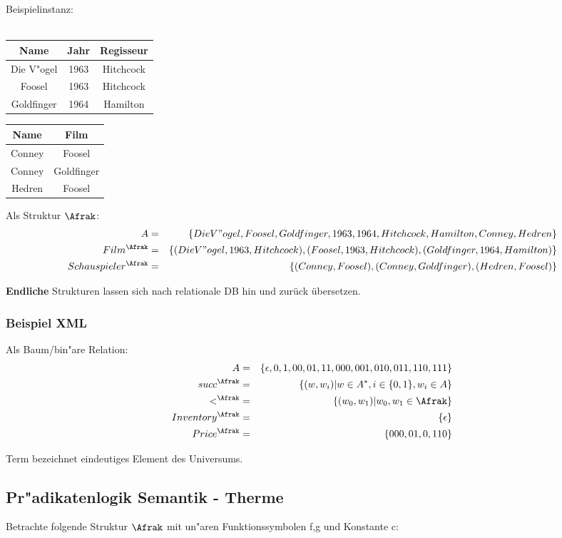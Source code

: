 Beispielinstanz: \\ \\
\begin{tabular}{|c|c|c|}
Name & Jahr & Regisseur \\
\hline
Die V"ogel & 1963 & Hitchcock \\
Foosel & 1963 & Hitchcock \\
Goldfinger & 1964 & Hamilton \\
\hline
\end{tabular} \begin{tabular}{|c|c|}
Name & Film \\
\hline
Conney & Foosel \\
Conney & Goldfinger \\
Hedren & Foosel \\
\hline
\end{tabular}

Als Struktur $\Afrak$:
\begin{eqnarray*}
A &=& \{Die V"ogel, Foosel, Goldfinger, 1963, 1964, Hitchcock, Hamilton, Conney, Hedren\}\\
Film^{\Afrak} &=& \{ (Die V"ogel, 1963, Hitchcock),
               (Foosel, 1963, Hitchcock),
               (Goldfinger, 1964, Hamilton) \} \\
Schauspieler^{\Afrak} &=& \{ (Conney, Foosel), (Conney,Goldfinger), (Hedren,Foosel)\}
\end{eqnarray*}

\textbf{Endliche} Strukturen lassen sich nach relationale DB hin und zurück übersetzen.

\subsubsection{Beispiel XML}
Als Baum/bin"are Relation:
\begin{eqnarray*}
A &=& \{\epsilon , 0, 1, 00, 01, 11, 000, 001, 010, 011, 110, 111\} \\
succ^{\Afrak} &=& \{(w, w_i) | w \in A^{*}, i \in \{0,1\}, w_i \in A \} \\
<^{\Afrak} &=& \{ (w_0, w_1) | w_0,w_1 \in \Afrak\} \\
Inventory^{\Afrak} &=& \{ \epsilon \} \\
Price^{\Afrak} &=& \{ 000, 01,0, 110 \}
\end{eqnarray*}

Term bezeichnet eindeutiges Element des Universums.

\subsection{Pr"adikatenlogik Semantik - Therme}
Betrachte folgende Struktur $\Afrak$ mit un"aren Funktionssymbolen f,g und Konstante c:

